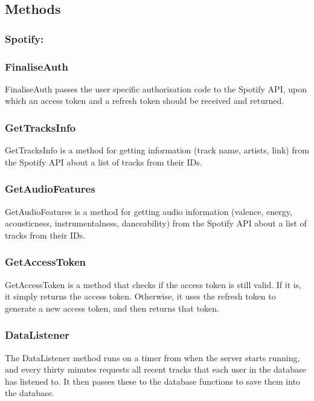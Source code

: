 \documentclass[10pt]{report}
\begin{document}
\subsection{Methods}

\subsubsection{Spotify:}

\hrulefill

\subsubsection{FinaliseAuth}
FinaliseAuth passes the user specific authorisation code to the Spotify API, upon which an access token and a refresh token should be received and returned.

\subsubsection{GetTracksInfo}
GetTracksInfo is a method for getting information (track name, artists, link) from the Spotify API about a list of tracks from their IDs.

\subsubsection{GetAudioFeatures}
GetAudioFeatures is a method for getting audio information (valence, energy, acousticness, instrumentalness, danceability) from the Spotify API about a list of tracks from their IDs.

\subsubsection{GetAccessToken}
GetAccessToken is a method that checks if the access token is still valid. If it is, it simply returns the access token. Otherwise, it uses the refresh token to generate a new access token, and then returns that token.

\subsubsection{DataListener}
The DataListener method runs on a timer from when the server starts running, and every thirty minutes requests all recent tracks that each user in the database has listened to. It then passes these to the database functions to save them into the database.
\end{document}
